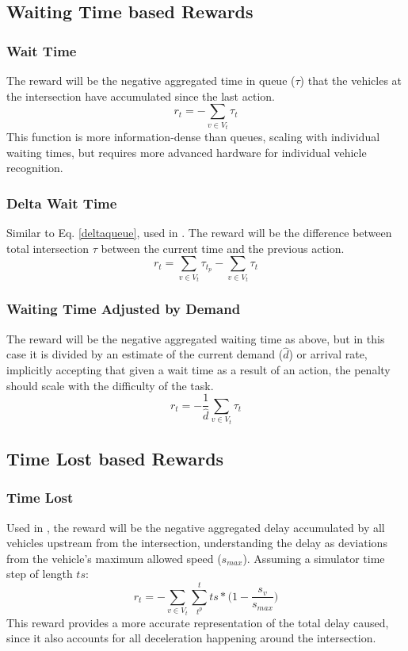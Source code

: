 \documentclass[conference]{IEEEtran}
\begin{document}
\subsection{Waiting Time based Rewards}
\subsubsection{Wait Time}
The reward will be the negative aggregated time in queue ($\tau$) that the vehicles at the intersection have accumulated since the last action. 
\begin{equation}
r_t = - \sum_{v \in V_t} \tau_{t}
\label{eq:wait_time}
\end{equation}
This function is more information-dense than queues, scaling with individual waiting times, but requires more advanced hardware for individual vehicle recognition.

\subsubsection{Delta Wait Time}
Similar to Eq. \ref{deltaqueue}, used in \cite{liang2018}. The reward will be the difference between total intersection $\tau$ between the current time and the previous action. 
\begin{equation}
r_t =  \sum_{v \in V_t} \tau_{t_p} -  \sum_{v \in V_t} \tau_{t}
\label{eq:delta_wait_time}
\end{equation}

\subsubsection{Waiting Time Adjusted by Demand}
The reward will be the negative aggregated waiting time as above, but in this case it is divided by an estimate of the current demand ($\hat{d}$) or arrival rate, implicitly accepting that given a wait time as a result of an action, the penalty should scale with the difficulty of the task.
\begin{equation}
   r_t = -\frac{1}{\hat{d}} \sum_{v \in V_t} \tau_{t}
\label{eq:wait_time_norm} 
\end{equation}

\subsection{Time Lost based Rewards}
\subsubsection{Time Lost}
Used in \cite{wan2018}, the reward will be the negative aggregated delay accumulated by all vehicles upstream from the intersection, understanding the delay as deviations from the vehicle's maximum allowed speed ($s_{max}$). 
Assuming a simulator time step of length $ts$:
\begin{equation}
    r_t = - \sum_{v \in V_t}  \sum_{t^p}^t ts * \big( 1-\frac{s_v}{s_{max}} \big)
\label{eq:delay}
\end{equation}
This reward provides a more accurate representation of the total delay caused, since it also accounts for all deceleration happening around the intersection. 
\end{document}
